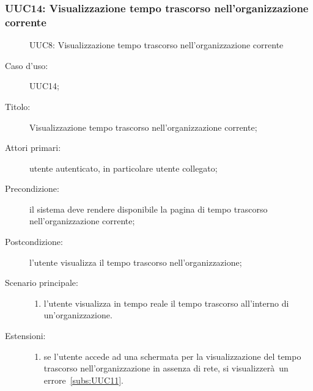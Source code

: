 \documentclass[../../../analisi-dei-requisiti.tex]{subfiles}
\begin{document}
\subsubsection{UUC14: Visualizzazione tempo trascorso nell'organizzazione corrente}%
\label{subs:UUC14}

\begin{figure}[H]
  \centering
  \caption{UUC8: Visualizzazione tempo trascorso nell'organizzazione corrente}%
  \label{fig:UUC14}
\end{figure}

\begin{description}
  \item[Caso d'uso:] UUC14;
  \item[Titolo:] Visualizzazione tempo trascorso nell'organizzazione corrente;
  \item[Attori primari:] utente autenticato, in particolare utente collegato;
  \item[Precondizione:] il sistema deve rendere disponibile la pagina di tempo trascorso nell'organizzazione corrente;
  \item[Postcondizione:] l'utente visualizza il tempo trascorso nell'organizzazione;
  \item[Scenario principale:]
        \begin{enumerate}
          \item l'utente visualizza in tempo reale il tempo trascorso all'interno di un'organizzazione.
        \end{enumerate}
  \item[Estensioni:]
        \begin{enumerate}
          \item se l'utente accede ad una schermata per la visualizzazione del tempo trascorso nell'organizzazione in assenza di rete, si visualizzerà un errore~\ref{subs:UUC11}.
        \end{enumerate}
\end{description}
\end{document}
